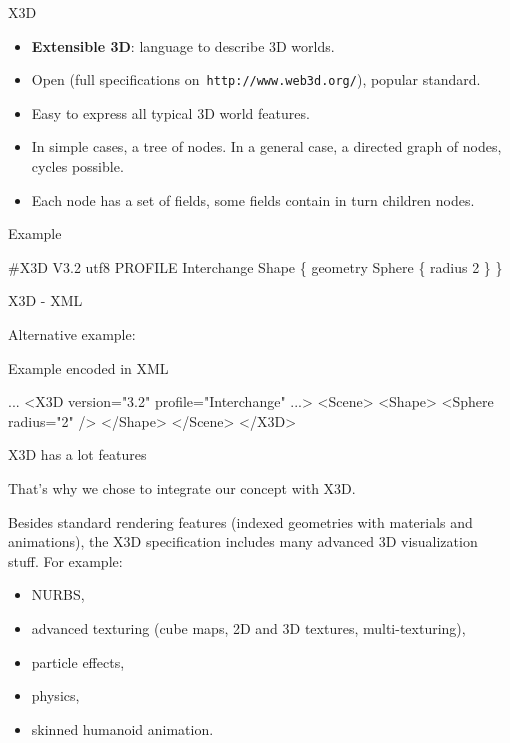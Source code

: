 \documentclass{beamer}
\begin{document}
\begin{frame}[fragile]{X3D}

\begin{itemize}
  \item \textbf{Extensible 3D}: language to describe 3D worlds.
  \item Open (full specifications on~\texttt{http://www.web3d.org/}), popular standard.
  \item Easy to express all typical 3D world features.
  \item In simple cases, a tree of nodes.
    In a general case, a directed graph of nodes, cycles possible.
  \item Each node has a set of fields, some fields contain in turn children nodes.
\end{itemize}

\begin{exampleblock}{Example}
\begin{semiverbatim}
\#X3D V3.2 utf8
PROFILE Interchange
Shape \{
  geometry Sphere \{ radius 2 \}
\}
\end{semiverbatim}
\end{exampleblock}
\end{frame}

\begin{frame}[fragile]{X3D - XML}

Alternative example:

\begin{exampleblock}{Example encoded in XML}
\begin{semiverbatim}
...
<X3D version="3.2" profile="Interchange" ...>
  <Scene>
    <Shape>
      <Sphere radius="2" />
    </Shape>
  </Scene>
</X3D>
\end{semiverbatim}
\end{exampleblock}

\end{frame}

\begin{frame}{X3D has a lot features}

That's why we chose to integrate our concept with X3D.

Besides standard rendering features (indexed geometries with materials
and animations), the X3D specification includes many
advanced 3D visualization stuff. For example:

\begin{itemize}
  \item NURBS,
  \item advanced texturing (cube maps, 2D and 3D textures, multi-texturing),
  \item particle effects,
  \item physics,
  \item skinned humanoid animation.
\end{itemize}
\end{frame}
\end{document}
